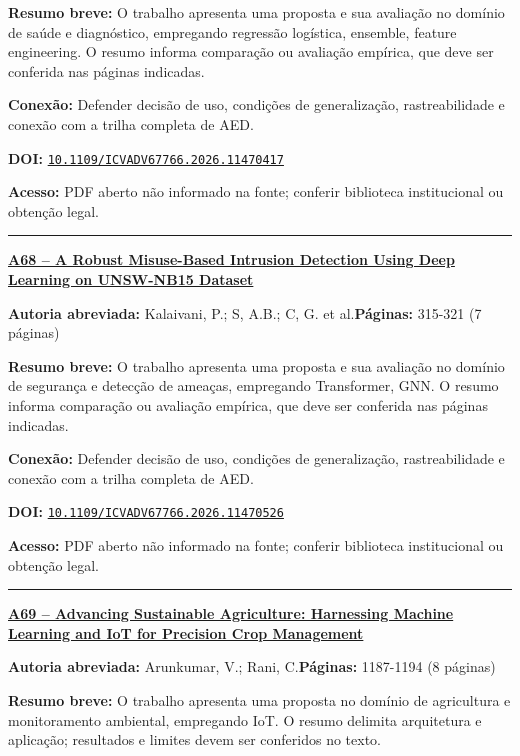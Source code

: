 \documentclass[10pt,a4paper]{article}
\begin{document}
\textbf{Resumo breve:} O trabalho apresenta uma proposta e sua avaliação no domínio de saúde e diagnóstico, empregando regressão logística, ensemble, feature engineering. O resumo informa comparação ou avaliação empírica, que deve ser conferida nas páginas indicadas.\par
\textbf{Conexão:} Defender decisão de uso, condições de generalização, rastreabilidade e conexão com a trilha completa de AED.\par
\textbf{DOI:} \href{https://doi.org/10.1109/ICVADV67766.2026.11470417}{\nolinkurl{10.1109/ICVADV67766.2026.11470417}}\par
\textbf{Acesso:} PDF aberto não informado na fonte; conferir biblioteca institucional ou obtenção legal.\par
\noindent\rule{\textwidth}{0.35pt}
\par\medskip\noindent
{\large\bfseries\href{https://doi.org/10.1109/ICVADV67766.2026.11470526}{A68 -- A Robust Misuse-Based Intrusion Detection Using Deep Learning on UNSW-NB15 Dataset}}\par\smallskip
\textbf{Autoria abreviada:} Kalaivani, P.; S, A.B.; C, G. et al.\quad \textbf{Páginas:} 315-321 (7 páginas)\par
\textbf{Resumo breve:} O trabalho apresenta uma proposta e sua avaliação no domínio de segurança e detecção de ameaças, empregando Transformer, GNN. O resumo informa comparação ou avaliação empírica, que deve ser conferida nas páginas indicadas.\par
\textbf{Conexão:} Defender decisão de uso, condições de generalização, rastreabilidade e conexão com a trilha completa de AED.\par
\textbf{DOI:} \href{https://doi.org/10.1109/ICVADV67766.2026.11470526}{\nolinkurl{10.1109/ICVADV67766.2026.11470526}}\par
\textbf{Acesso:} PDF aberto não informado na fonte; conferir biblioteca institucional ou obtenção legal.\par
\noindent\rule{\textwidth}{0.35pt}
\par\medskip\noindent
{\large\bfseries\href{https://doi.org/10.1109/ICVADV67766.2026.11470396}{A69 -- Advancing Sustainable Agriculture: Harnessing Machine Learning and IoT for Precision Crop Management}}\par\smallskip
\textbf{Autoria abreviada:} Arunkumar, V.; Rani, C.\quad \textbf{Páginas:} 1187-1194 (8 páginas)\par
\textbf{Resumo breve:} O trabalho apresenta uma proposta no domínio de agricultura e monitoramento ambiental, empregando IoT. O resumo delimita arquitetura e aplicação; resultados e limites devem ser conferidos no texto.\par
\end{document}
